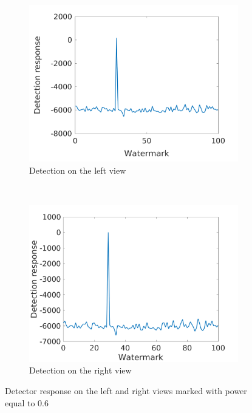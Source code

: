 \begin{figure}[h!]
    \centering
    \begin{subfigure}[t]{0.5\textwidth}
        \centering
\includegraphics[width=1\textwidth]{./img/likelihood/correct_LikelihoodL_06.png}
          \caption{\small{Detection on the left view}}
\label{fig:Ll06}

    \end{subfigure}%
    ~ 
    \begin{subfigure}[t]{0.5\textwidth}
        \centering
\includegraphics[width=1\textwidth]{./img/likelihood/correct_LikelihoodLr_06.png}
           \caption{\small{Detection on the right view}}
\label{fig:Lr06}
    \end{subfigure}
    \caption{Detector response on the left and right views marked with power equal to 0.6}
     \label{fig:Ll}
\end{figure}



